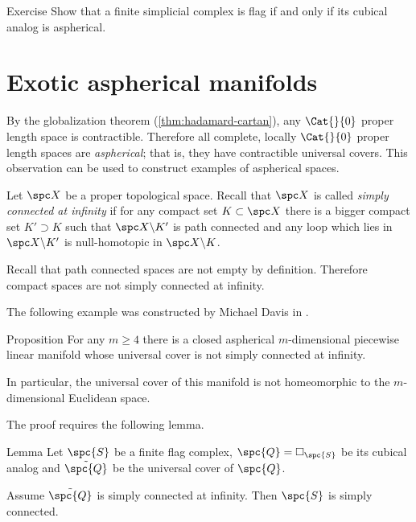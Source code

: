 \begin{thm}{Exercise}\label{ex:flag-aspherical}
Show that a finite simplicial complex is flag 
if and only if its cubical analog is aspherical.
\end{thm}

\section{Exotic aspherical manifolds}


By the globalization theorem (\ref{thm:hadamard-cartan}),
any $\Cat{}{0}$ proper length space is contractible.
Therefore all complete, locally $\Cat{}{0}$ proper length spaces 
are \emph{aspherical};
that is, they have contractible universal covers.
This observation can be used to construct examples of aspherical spaces. 

Let $\spc X$ be a proper topological space.
Recall that $\spc X$ is called 
\emph{simply connected at infinity} 
if for any compact set $K\subset\spc X$
there is a bigger compact set $K'\supset K$
such that  $\spc X\backslash K'$ is path connected 
and any loop which lies in $\spc X\backslash K'$
is null-homotopic in  $\spc X\backslash K$.

Recall that path connected spaces are not empty by definition.
Therefore compact spaces are not simply connected at infinity.

The following example was constructed by Michael 
Davis in \cite{davis-noneuclidean}.

\begin{thm}{Proposition}\label{prop:aspherical}
For any  $m\ge 4$ there is a closed aspherical 
$m$-dimensional piecewise linear manifold
whose universal cover is not simply connected at infinity.

In particular, the universal cover of this manifold 
is not homeomorphic to the $m$-dimensional Euclidean space.
\end{thm}

The proof requires the following lemma.

\begin{thm}{Lemma}\label{lem:example-pi_infty}
Let $\spc{S}$ be a finite flag complex,
$\spc{Q}=\square_{\spc{S}}$ be its cubical analog
and $\tilde{\spc{Q}}$ be the universal cover of $\spc{Q}$.

Assume  $\tilde{\spc{Q}}$ is simply connected at infinity.
Then $\spc{S}$ is simply connected.
\end{thm}

